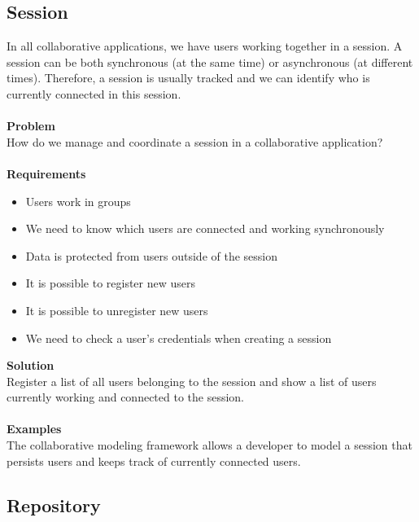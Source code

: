 \subsection{Session}

In all collaborative applications, we have users working together in a session. A session can be both synchronous (at the same time) or asynchronous (at different times). Therefore, a session is usually tracked and we can identify who is currently connected in this session.
\\ \\
\textbf{Problem}
\\
How do we manage and coordinate a session in a collaborative application?
\\ \\
\textbf{Requirements}
\begin{itemize}
\item{Users work in groups}
\item{We need to know which users are connected and working synchronously}
\item{Data is protected from users outside of the session}
\item{It is possible to register new users}
\item{It is possible to unregister new users}
\item{We need to check a user's credentials when creating a session}
\end{itemize}
\textbf{Solution}
\\
Register a list of all users belonging to the session and show a list of users currently working and connected to the session.
\\ \\
\textbf{Examples}
\\
The collaborative modeling framework allows a developer to model a session that persists users and keeps track of currently connected users.

\subsection{Repository}

